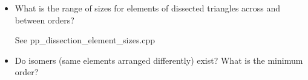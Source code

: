 \documentclass[12pt,amstags,fleqn]{article}
\theoremstyle{plain}
\theoremstyle{definition}
\begin{document}
\begin{itemize}
\begin{center}
\end{center}

\begin{center}
\end{center}

\begin{center}
\end{center}

\begin{center}
\end{center}

\begin{center}
\end{center}

\begin{center}
\end{center}

\begin{center}
\end{center}

\begin{center}
\end{center}

\begin{center}
\end{center}

\begin{center}
\end{center}



\item What is the range of sizes for elements of dissected triangles
across and between orders?

See pp\_dissection\_element\_sizes.cpp

\item Do isomers (same elements arranged differently) exist? What is
the minimum order?


\end{itemize}
\end{document}
